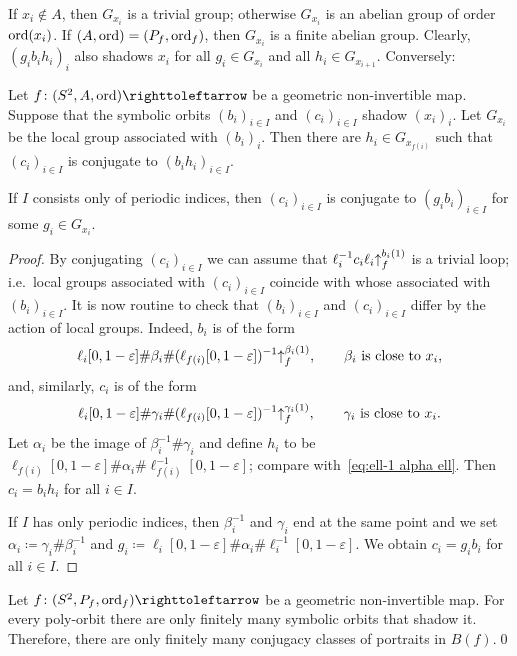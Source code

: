 \documentclass{amsart}
\begin{document}
If $x_i\not\in A$, then $G_{x_i}$ is a trivial group; otherwise
$G_{x_i}$ is an abelian group of order $\operatorname{ord} (x_i)$. If
$(A,\operatorname{ord})=(P_f,\operatorname{ord}_f)$, then $G_{x_i}$ is a finite abelian
group. Clearly, $(g_i b_i h_i)_i$ also shadows $x_i$ for all
$g_i\in G_{x_i}$ and all $h_i\in G_{x_{i+1}}$. Conversely:
\begin{lem}\label{lem:orb shad the same pnt}
Let $f\colon(S^2,A,\ord)\selfmap$ be a geometric non-invertible map.
  Suppose that the symbolic orbits $(b_i)_{i\in I}$ and
  $(c_i)_{i\in I}$ shadow $(x_i)_i$. Let $G_{x_i}$ be the local group
  associated with $(b_i)_i$. Then there are $h_i\in G_{x_{f(i)}}$ such
  that $(c_i)_{i\in I}$ is conjugate to $(b_i h_{i})_{i\in I}$.

  If $I$ consists only of periodic indices, then $(c_i)_{i\in I}$ is
  conjugate to $(g_i b_i)_{i\in I}$ for some $g_i\in G_{x_{i}}$.
\end{lem}
\begin{proof}
  By conjugating $(c_i)_{i\in I}$ we can assume that
  $\ell_i^{-1} c_i \ell_i {\uparrow}_{f}^{b_i(1)}$ is a trivial loop; i.e.\
  local groups associated with $(c_i)_{i\in I}$ coincide with whose
  associated with $(b_i)_{i\in I}$. It is now routine to check that
  $(b_i)_{i\in I}$ and $(c_i)_{i\in I}$ differ by the action of local
  groups. Indeed, $b_i$ is of the form
  \[\ell_i[0,1-\varepsilon] \#\beta_i\#(\ell_{f(i)}
    [0,1-\varepsilon])^{-1} {\uparrow}_{f}^{\beta_i(1)},\qquad\beta_i\text{ is close to }x_i,
  \]
  and, similarly, $c_i$ is of the form
  \[\ell_i[0,1-\varepsilon] \#\gamma_i\#(\ell_{f(i)} [0,1-\varepsilon])^{-1} {\uparrow}_{f}^{\gamma_i(1)},\qquad\gamma_i\text{ is close to }x_i.\]
  Let $\alpha_i$ be the image of $\beta^{-1}_i\#\gamma_i$ and define
  $h_i$ to be
  $\ell_{f(i)} [0,1-\varepsilon] \#\alpha_{i}\#
  \ell_{f(i)}^{-1}[0,1-\varepsilon]$; compare with~\eqref{eq:ell-1
    alpha ell}. Then $c_i =b_i h_{i}$ for all $i\in I$.

  If $I$ has only periodic indices, then $\beta^{-1}_i$ and $\gamma_i$
  end at the same point and we set
  $\alpha_i\coloneqq \gamma_i\#\beta^{-1}_i$ and
  $g_i\coloneqq \ell_{i} [0,1-\varepsilon] \#\alpha_{i}\#
  \ell_{i}^{-1}[0,1-\varepsilon]$. We obtain $c_i=g_i b_i$ for all
  $i\in I$.
\end{proof}

\begin{cor}\label{cor:shaw is finite to one} Let $f\colon(S^2,P_f,\ord_f)\selfmap$ be a geometric non-invertible map. For every poly-orbit there are only finitely many symbolic orbits
  that shadow it.  Therefore, there are only
  finitely many conjugacy classes of portraits in $B(f)$.\qed
\end{cor}
\end{document}
